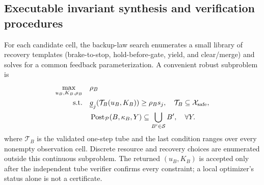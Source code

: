 \documentclass[letterpaper]{article} %
\begin{document}
\subsection{Executable invariant synthesis and verification procedures}
\label{app:algorithms}
For each candidate cell, the backup-law search enumerates a small library of
recovery templates (brake-to-stop, hold-before-gate, yield, and clear/merge)
and solves for a common feedback parameterization. A convenient robust
subproblem is
\begin{equation}
\begin{aligned}
\max_{u_B,K_B,\rho_B}\quad &\rho_B\\
\text{s.t.}\quad
&\underline g_j(\mathcal T_B(u_B,K_B))\geq\rho_Bs_j,\quad
\mathcal T_B\subseteq\mathcal X_{\rm safe},\\
&\operatorname{Post}_{\mathcal P}(B,\kappa_B,Y)
\subseteq\bigcup_{B'\in\mathcal S}B',\quad\forall Y.
\end{aligned}
\label{eq:backup-synthesis}
\end{equation}
where $\mathcal T_B$ is the validated one-step tube and the last condition
ranges over every nonempty observation cell. Discrete resource and recovery
choices are enumerated outside this continuous subproblem. The returned
$(u_B,K_B)$ is accepted only after the independent tube verifier confirms
every constraint; a local optimizer's status alone is not a certificate.
\end{document}
